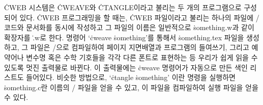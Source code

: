 \.{CWEB} 시스템은 \.{CWEAVE}와 \.{CTANGLE}이라고 불리는 두 개의 프로그램으로
구성되어 있다. \.{CWEB} 프로그래밍을 할 때는, \.{CWEB} 파일이라고 불리는
하나의 파일에 \CEE/ 코드와 문서화를 동시에
작성하고 그 파일의 이름은 일반적으로 \.{something.w}과 같이
확장자를 \.{.w}로 한다. 명령어 `\.{cweave} \.{something}'를
통해서 \.{something.tex} 파일을 생성하고, 그 파일은 \TEX/으로
컴파일하여 페이지 지면배열과 프로그램의 들여쓰기, 그리고 예약어나
변수명 혹은 수학 기호들을 각각 다른 폰트로 표현하는 등 우리가 쉽게
읽을 수 있도록 멋진 출력물로 바뀐다. 이 출력물에는 \.{cweave} 명령어가
자동으로 만든 색인 리스트도 들어있다. 비슷한 방법으로, `\.{ctangle}
\.{something}' 이란 명령을 실행하면 \.{something.c}란 
이름의 \CEE/ 파일을 얻을 수 있고, 이 파일을 컴파일하여 실행 파일을 얻을
수 있다.

